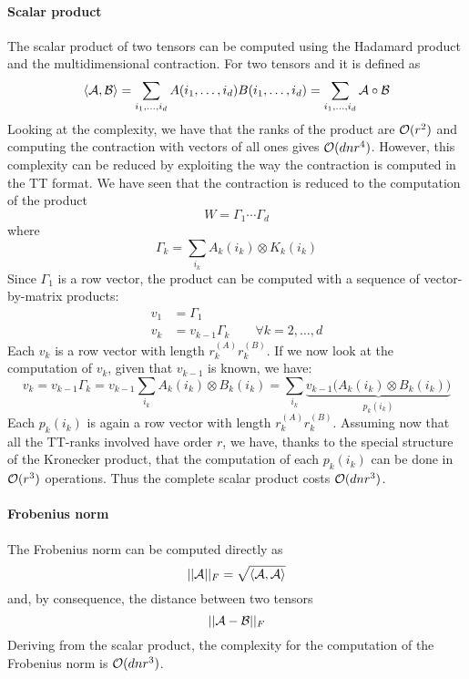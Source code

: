 \paragraph{Scalar product}
The scalar product of two tensors can be computed using the Hadamard product and the multidimensional contraction. For two tensors \A and \B it is defined as
\begin{equation*}
  \langle \mathcal{A}, \mathcal{B} \rangle = \sum_{i_1,\ldots,i_d} A(i_1,\ldots,i_d)B(i_1,\ldots,i_d) = \sum_{i_1,\ldots,i_d} \mathcal{A} \circ \mathcal{B}
\end{equation*}
Looking at the complexity, we have that the ranks of the product are $\mathcal{O}(r^2)$ and computing the contraction with vectors of all ones gives $\mathcal{O}(dnr^4)$.
However, this complexity can be reduced by exploiting the way the contraction is computed in the TT format. We have seen that the contraction is reduced to the computation of the product
\begin{equation*}
  W = \Gamma_1 \cdots \Gamma_d
\end{equation*}
where
\begin{equation*}
  \Gamma_k = \sum_{i_k}A_k(i_k) \otimes K_k(i_k)
\end{equation*}
Since $\Gamma_1$ is a row vector, the product can be computed with a sequence of vector-by-matrix products:
\begin{equation*}
  \begin{split}
    v_1 &= \Gamma_1\\
    v_k &= v_{k-1} \Gamma_k \qquad \forall k = 2,\ldots,d
  \end{split}
\end{equation*}
Each $v_k$ is a row vector with length $r_k^{(A)} r_k^{(B)}$. If we now look at the computation of $v_k$, given that $v_{k-1}$ is known, we have:
\begin{equation*}
  v_k = v_{k-1} \Gamma_k = v_{k-1} \sum_{i_k} A_k(i_k) \otimes B_k(i_k) = \sum_{i_k} \underbrace{v_{k-1} \Big( A_k(i_k) \otimes B_k(i_k) \Big) }_{p_k(i_k)}
\end{equation*}
Each $p_k(i_k)$ is again a row vector with length $r_k^{(A)} r_k^{(B)}$.
Assuming now that all the TT-ranks involved have order $r$, we have, thanks to the special structure of the Kronecker product, that the computation of each $p_k(i_k)$ can be done in $\mathcal{O}(r^3)$ operations. Thus the complete scalar product costs $\mathcal{O}(dnr^3)$.

\paragraph{Frobenius norm}
The Frobenius norm can be computed directly as
\begin{equation*}
  ||\mathcal{A}||_F = \sqrt{\langle \mathcal{A}, \mathcal{A} \rangle}
\end{equation*}
and, by consequence, the distance between two tensors
\begin{equation*}
  ||\mathcal{A} - \mathcal{B}||_F
\end{equation*}
Deriving from the scalar product, the complexity for the computation of the Frobenius norm is $\mathcal{O}(dnr^3)$.

